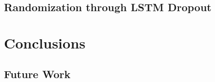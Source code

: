 \documentclass{article}
\begin{document}
\subsection{Randomization through LSTM Dropout}

\section{Conclusions}

\subsection{Future Work}



\end{document}
